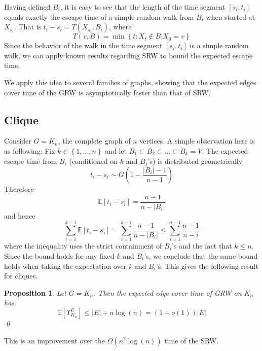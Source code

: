 \documentclass[12pt,a4paper]{article}
\newcommand{\set}[1]{{\left\{#1 \right\}}}
\newcommand{\0}{{\bf 0}}
\newcommand{\E}{{\mathbb E}}
\newtheorem{proposition}[theorem]{Proposition}
\begin{document}
    Having defined $B_i$, it is easy to see that the length of the time segment $[s_i, t_i]$
    equals exactly the escape time of a simple random walk from $B_i$ when started at $X_{s_i}$.
    That is $t_i - s_i = T(X_{s_i},B_i)$, where
    \[
        T(v,B) = \min\set{t: X_t \notin B | X_0 = v}
    \]
    Since the behavior of the walk in the time segment $[s_i, t_i]$ is a simple random walk,
    we can apply known results regarding SRW to bound the expected escape time.

    We apply this idea to several families of graphs,
    showing that the expected edges cover time of the GRW is asymptotically faster than that of SRW.

\subsection{Clique}\label{subsec:cluque}

    Consider $G = K_n$, the complete graph of $n$ vertices.
    A simple observation here is as following:
    Fix $k \in \set{1,\dots,n}$ and let $B_1 \subset B_2 \subset ... \subset B_k = V$.
    The expected escape time from $B_i$ (conditioned on $k$ and $B_j$'s) is distributed geometrically
    \[
        t_i - s_i \sim G(1 - \frac{|B_i| - 1}{n - 1})
    \]
    Therefore
    \[
        \E[t_i - s_i ] = \frac{n-1}{n - |B_i|}
    \]
    and hence
    \[
        \sum_{i=1}^{k-1} \E[t_i - s_i]  = \sum_{i=1}^{k-1} \frac{n-1}{n - |B_i|} \leq \sum_{i=1}^{n-1} \frac{n - 1}{n - i}
    \]
    where the inequality uses the strict containment of $B_i$'s and the fact that $k \leq n$.
    Since the bound holds for any fixed $k$ and $B_i$'s, we conclude that
    the same bound holds when taking the expectation over $k$ and $B_i$'s.
    This gives the following result for cliques.
    \begin{proposition}\label{thm:clique}
        Let $G = K_n$. Then the expected edge cover time of GRW on $K_n$ has
        \[
            \E[T^E_{K_n}] \leq |E| + n \log(n) = (1 + o(1))|E|
        \]\qed
    \end{proposition}
    This is an improvement over the $\Omega (n^2 \log(n))$ time of the SRW.
\end{document}
